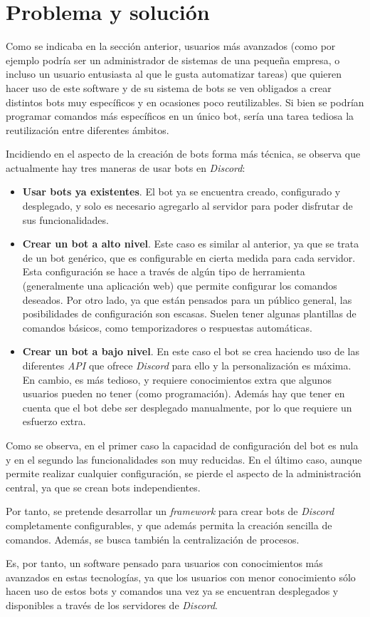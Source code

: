 \section{Problema y solución}

Como se indicaba en la sección anterior, usuarios más avanzados (como por ejemplo podría ser un administrador de sistemas de una pequeña empresa, o incluso un usuario entusiasta al que le gusta automatizar tareas) que quieren hacer uso de este software y de su sistema de bots se ven obligados a crear distintos bots muy específicos y en ocasiones poco reutilizables. Si bien se podrían programar comandos más específicos en un único bot, sería una tarea tediosa la reutilización entre diferentes ámbitos.

Incidiendo en el aspecto de la creación de bots forma más técnica, se observa que actualmente hay tres maneras de usar bots en \textit{Discord}:

\begin{itemize}
	\item \textbf{Usar bots ya existentes}. El bot ya se encuentra creado, configurado y desplegado, y solo es necesario agregarlo al servidor para poder disfrutar de sus funcionalidades.
	\item \textbf{Crear un bot a alto nivel}. Este caso es similar al anterior, ya que se trata de un bot genérico, que es configurable en cierta medida para cada servidor. Esta configuración se hace a través de algún tipo de herramienta (generalmente una aplicación web) que permite configurar los comandos deseados. Por otro lado, ya que están pensados para un público general, las posibilidades de configuración son escasas. Suelen tener algunas plantillas de comandos básicos, como temporizadores o respuestas automáticas.
	\item \textbf{Crear un bot a bajo nivel}. En este caso el bot se crea haciendo uso de las diferentes \textit{API} que ofrece \textit{Discord} para ello y la personalización es máxima. En cambio, es más tedioso, y requiere conocimientos extra que algunos usuarios pueden no tener (como programación). Además hay que tener en cuenta que el bot debe ser desplegado manualmente, por lo que requiere un esfuerzo extra.
\end{itemize}

Como se observa, en el primer caso la capacidad de configuración del bot es nula y en el segundo las funcionalidades son muy reducidas. En el último caso, aunque permite realizar cualquier configuración, se pierde el aspecto de la administración central, ya que se crean bots independientes. 

Por tanto, se pretende desarrollar un \textit{framework} para crear bots de \textit{Discord} completamente configurables, y que además permita la creación sencilla de comandos. Además, se busca también la centralización de procesos.

Es, por tanto, un software pensado para usuarios con conocimientos más avanzados en estas tecnologías, ya que los usuarios con menor conocimiento sólo hacen uso de estos bots y comandos una vez ya se encuentran desplegados y disponibles a través de los servidores de \textit{Discord}.

